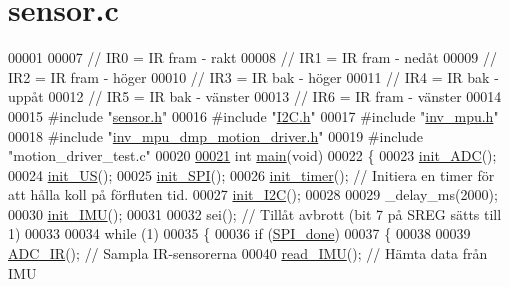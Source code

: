 \hypertarget{sensor_8c_source}{}\section{sensor.\+c}
\label{sensor_8c_source}

\begin{DoxyCode}
00001 
00007 \textcolor{comment}{// IR0 = IR fram - rakt}
00008 \textcolor{comment}{// IR1 = IR fram - nedåt}
00009 \textcolor{comment}{// IR2 = IR fram - höger}
00010 \textcolor{comment}{// IR3 = IR bak - höger}
00011 \textcolor{comment}{// IR4 = IR bak - uppåt}
00012 \textcolor{comment}{// IR5 = IR bak - vänster}
00013 \textcolor{comment}{// IR6 = IR fram - vänster}
00014 
00015 \textcolor{preprocessor}{#include "\hyperlink{sensor_8h}{sensor.h}"}
00016 \textcolor{preprocessor}{#include "\hyperlink{_i2_c_8h}{I2C.h}"}
00017 \textcolor{preprocessor}{#include "\hyperlink{inv__mpu_8h}{inv\_mpu.h}"}
00018 \textcolor{preprocessor}{#include "\hyperlink{inv__mpu__dmp__motion__driver_8h}{inv\_mpu\_dmp\_motion\_driver.h}"}
00019 \textcolor{preprocessor}{#include "motion\_driver\_test.c"}
00020 
\hypertarget{sensor_8c_source.tex_l00021}{}\hyperlink{sensor_8c_a840291bc02cba5474a4cb46a9b9566fe}{00021} \textcolor{keywordtype}{int} \hyperlink{sensor_8c_a840291bc02cba5474a4cb46a9b9566fe}{main}(\textcolor{keywordtype}{void})
00022 \{
00023     \hyperlink{sensor_8c_a342ab07b607f3dc4efa0655ca1acd164}{init\_ADC}();
00024     \hyperlink{sensor_8c_a16afe9a4d2627f3f7f1bab054d4ad7ad}{init\_US}();
00025     \hyperlink{sensor_8c_a1065be4c03eff55f82e136ccb95a2854}{init\_SPI}();
00026     \hyperlink{sensor_8c_a38016ab7b2931bcb950e0c6f3ba3f342}{init\_timer}(); \textcolor{comment}{// Initiera en timer för att hålla koll på förfluten tid.}
00027     \hyperlink{sensor_8c_a87c8819d26491fb701918e147117710c}{init\_I2C}();
00028 
00029     \_delay\_ms(2000);
00030     \hyperlink{sensor_8c_a1009b8de0745458d734bd73beda5ea25}{init\_IMU}();
00031 
00032     sei();                      \textcolor{comment}{// Tillåt avbrott (bit 7 på SREG sätts till 1)}
00033 
00034     \textcolor{keywordflow}{while} (1)
00035     \{
00036         \textcolor{keywordflow}{if} (\hyperlink{sensor_8h_a320a1ee237ba550bcdffd131a4198e17}{SPI\_done})
00037         \{
00038 
00039             \hyperlink{sensor_8c_a41da5db2af35bde04662acc0c8ed5e22}{ADC\_IR}();                     \textcolor{comment}{// Sampla IR-sensorerna}
00040             \hyperlink{sensor_8c_ad5232fda58bb026c495517be3c84307a}{read\_IMU}();                     \textcolor{comment}{// Hämta data från IMU}

\end{DoxyCode}
